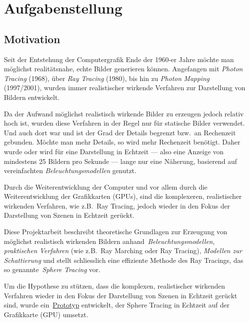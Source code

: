 
\chapter{Aufgabenstellung}
\label{chap:scope}

\section{Motivation}
\label{sec:motivation}

Seit der Entstehung der Computergrafik Ende der 1960-er Jahre möchte man
möglichst realitätsnahe, echte Bilder generieren können. Angefangen mit
\textit{Photon Tracing} (1968), über \textit{Ray Tracing} (1980), bis hin
zu \textit{Photon Mapping} (1997/2001), wurden immer realistischer
wirkende Verfahren zur Darstellung von Bildern entwickelt.

Da der Aufwand möglichst realistisch wirkende Bilder zu erzeugen jedoch
relativ hoch ist, wurden diese Verfahren in der Regel nur für statische
Bilder verwendet. Und auch dort war und ist der Grad der Details
begrenzt bzw.\ an Rechenzeit gebunden. Möchte man mehr Details, so wird
mehr Rechenzeit benötigt. Daher wurde oder wird für eine Darstellung in
Echtzeit --- also eine Anzeige von mindestens 25 Bildern pro
Sekunde --- lange nur eine Näherung, basierend auf vereinfachten
\textit{Beleuchtungsmodellen} genutzt.

Durch die Weiterentwicklung der Computer und vor allem durch die
Weiterentwicklung der Grafikkarten (GPUs), sind die komplexeren,
realistischer wirkenden Verfahren, wie z.B.\ Ray Tracing, jedoch
wieder in den Fokus der Darstellung von Szenen in Echtzeit gerückt.

Diese Projektarbeit beschreibt theoretische Grundlagen zur Erzeugung von
möglichst realistisch wirkenden Bildern
anhand~\textit{Beleuchtungsmodellen}, \textit{praktischen Verfahren}
(wie z.B.\ Ray Marching oder Ray Tracing), \textit{Modellen zur
    Schattierung} und stellt schliesslich eine effiziente Methode des
Ray Tracings, das so genannte~\textit{Sphere Tracing} vor.

Um die Hypothese zu stützen, dass die komplexen, realistischer wirkenden
Verfahren wieder in den Fokus der Darstellung von Szenen in Echtzeit
gerückt sind, wurde ein~\hyperref[chap:prototype]{Prototyp} entwickelt,
der Sphere Tracing in Echtzeit auf der Grafikkarte (GPU) umsetzt.

